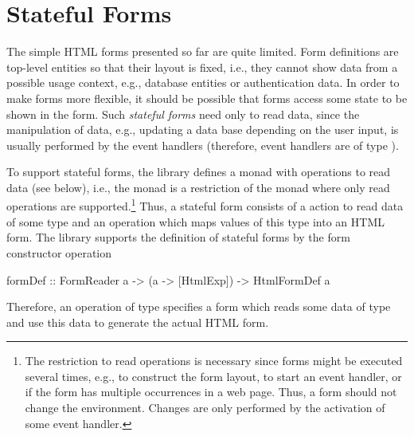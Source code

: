 \section{Stateful Forms}

The simple HTML forms presented so far are quite limited.
Form definitions are top-level entities so that their
layout is fixed, i.e., they cannot show data
from a possible usage context,
e.g., database entities or authentication data.
In order to make forms more flexible, it should be possible
that forms access some state to be shown in the form.
Such \emph{stateful forms} need only to read data,
since the manipulation of data, e.g., updating a data base
depending on the user input,
is usually performed by the event handlers
(therefore, event handlers are of type ).

To support stateful forms, the library 
defines a monad  with
operations to read data (see below), i.e.,
the  monad is a restriction of the  monad
where only read operations are supported.\footnote{The restriction
to read operations is necessary since forms might be executed
several times, e.g., to construct the form layout,
to start an event handler, or if the form
has multiple occurrences in a web page.
Thus, a form should not change the environment.
Changes are only performed by the activation of some event handler.}
Thus, a stateful form consists of a  action
to read data of some type  and an operation which maps
values of this type into an HTML form.
The library  supports the definition
of stateful forms by the form constructor operation
%
\begin{curry}
formDef :: FormReader a -> (a -> [HtmlExp]) -> HtmlFormDef a
\end{curry}
%
Therefore, an operation of type 
specifies a form which reads some data of type 
and use this data to generate the actual HTML form.

